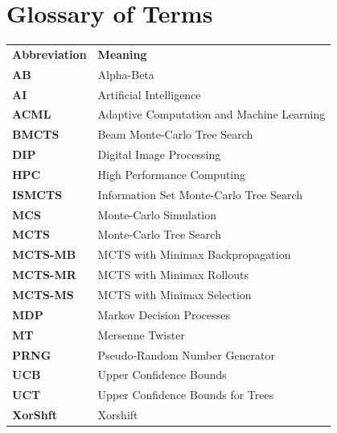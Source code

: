 \documentclass[journal]{IEEEtran}
\begin{document}
\section*{Glossary of Terms}
\begin{table}[H]
\centering
\begin{tabular}{ll}
\textbf{Abbreviation} & \textbf{Meaning}                          \\
\textbf{AB}           & Alpha-Beta                                \\
\textbf{AI}           & Artificial Intelligence                   \\
\textbf{ACML}         & Adaptive Computation and Machine Learning \\
\textbf{BMCTS}        & Beam Monte-Carlo Tree Search              \\
\textbf{DIP}          & Digital Image Processing                  \\
\textbf{HPC}          & High Performance Computing                \\
\textbf{ISMCTS}       & Information Set Monte-Carlo Tree Search   \\
\textbf{MCS}          & Monte-Carlo Simulation                    \\
\textbf{MCTS}         & Monte-Carlo Tree Search                   \\
\textbf{MCTS-MB}      & MCTS with Minimax Backpropagation         \\
\textbf{MCTS-MR}      & MCTS with Minimax Rollouts                \\
\textbf{MCTS-MS}      & MCTS with Minimax Selection               \\
\textbf{MDP}          & Markov Decision Processes                 \\
\textbf{MT}           & Mersenne Twister                          \\
\textbf{PRNG}         & Pseudo-Random Number Generator            \\
\textbf{UCB}          & Upper Confidence Bounds                   \\
\textbf{UCT}          & Upper Confidence Bounds for Trees         \\
\textbf{XorShft}      & Xorshift                                 
\end{tabular}
\end{table}

\ifCLASSOPTIONcaptionsoff
  \newpage
\fi
\end{document}
